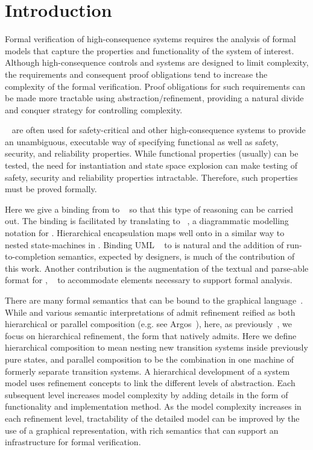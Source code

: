 
\section{Introduction}
\label{sec:introduction}

Formal verification of high-consequence systems requires the analysis
of formal models that capture the properties and functionality of the
system of interest. Although high-consequence controls and systems are
designed to limit complexity, the requirements and consequent proof
obligations tend to increase the complexity of the formal verification.  
Proof obligations for such requirements can be made more tractable using
abstraction/refinement, providing a natural divide and conquer
strategy for controlling complexity.

\Statecharts~\cite{Harel} are often used for safety-critical and other high-consequence systems to provide an unambiguous, executable way of specifying functional as well as safety, security, and reliability properties. 
While functional properties (usually) can be tested, the need for instantiation and state space explosion can make testing of safety, security and reliability properties intractable. Therefore, such properties must be proved formally.

Here we give a binding from \Statecharts to \EventB~\cite{abrial10:_model_event_b} so that this type of reasoning can be carried out.
The binding is facilitated by translating to \mbox{\iUMLB~\cite{snook14:_b_statem,Snook2006,Snook12:FMCO}}, a diagrammatic modelling notation for \mbox{\EventB.}
Hierarchical encapsulation maps well onto \Statecharts in a similar way to nested state-machines in \iUMLB.
Binding UML \Statecharts~\cite{Rumbaugh2004} to \iUMLB is natural and the addition of run-to-completion semantics, expected by \Statechart
designers, is much of the contribution of this work.  
Another contribution is the augmentation of the textual and parse-able format for \Statecharts, \SCXML~\cite{scxmlwebsite} to accommodate elements necessary to support formal analysis. 

There are many formal semantics that can be bound to 
 the \Statechart graphical language~\cite{Eshuis_2009}. While \Statecharts and various semantic interpretations of
\Statecharts admit refinement reified as both hierarchical or parallel
composition (e.g. see Argos~\cite{Maraninchi91theargos}), here, as
previously~\cite{snook14:_b_statem}, we focus on hierarchical
refinement, the form that \EventB natively admits.  Here we define
hierarchical composition to mean nesting new transition systems inside
previously pure states, and parallel composition to be the combination
in one machine of formerly separate transition systems.
A hierarchical development of a system model uses refinement
concepts to link the different levels of abstraction. Each subsequent
level increases model complexity by adding details in the form of
functionality and implementation method. As the model complexity
increases in each refinement level, tractability of the detailed model
can be improved by the use of a graphical representation, with rich
semantics that can support an infrastructure for formal verification.



